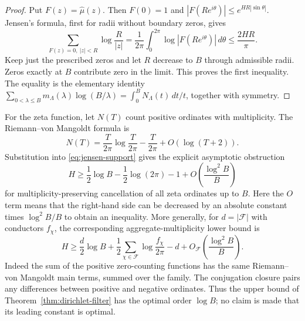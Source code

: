 \begin{proof}
Put $F(z)=\widehat\mu(z)$. Then $F(0)=1$ and
$|F(Re^{i\theta})|\le e^{HR|\sin\theta|}$. Jensen's formula, first
for radii without boundary zeros, gives
\[
 \sum_{F(z)=0,\ |z|<R}\log\frac R{|z|}
 =\frac1{2\pi}\int_0^{2\pi}\log|F(Re^{i\theta})|\,d\theta
 \le\frac{2HR}\pi.
\]
Keep just the prescribed zeros and let $R$ decrease to $B$ through
admissible radii. Zeros exactly at $B$ contribute zero in the limit.
This proves the first inequality. The equality is the elementary
identity
$\sum_{0<\lambda\le B}m_\Lambda(\lambda)\log(B/\lambda)
 =\int_0^BN_\Lambda(t)\,dt/t$, together with symmetry.
\end{proof}

For the zeta function, let $N(T)$ count positive ordinates with
multiplicity. The Riemann--von Mangoldt formula \cite{Montgomery,CGG} is
\[
 N(T)=\frac{T}{2\pi}\log\frac{T}{2\pi}
       -\frac{T}{2\pi}+O(\log(T+2)).
\]
Substitution into \eqref{eq:jensen-support} gives the explicit
asymptotic obstruction
\begin{equation}\label{eq:zeta-support-lower}
 H\ge\frac12\log B-\frac12\log(2\pi)-1
       +O\!\left(\frac{\log^2 B}{B}\right)
\end{equation}
for multiplicity-preserving cancellation of all zeta ordinates up to
$B$. Here the $O$ term means that the right-hand side can be decreased
by an absolute constant times $\log^2B/B$ to obtain an inequality.
More generally, for $d=|\mathcal F|$ with conductors $f_\chi$,
the corresponding aggregate-multiplicity lower bound is
\begin{equation}\label{eq:family-support-lower}
 H\ge\frac d2\log B+
       \frac12\sum_{\chi\in\mathcal F}\log\frac{f_\chi}{2\pi}
       -d+O_{\mathcal F}\!\left(\frac{\log^2 B}{B}\right).
\end{equation}
Indeed the sum of the positive zero-counting functions has the same
Riemann--von Mangoldt main terms, summed over the family. The
conjugation closure pairs any differences between positive and
negative ordinates. Thus the upper bound of
Theorem~\ref{thm:dirichlet-filter} has the optimal order $\log B$;
no claim is made that its leading constant is optimal.

